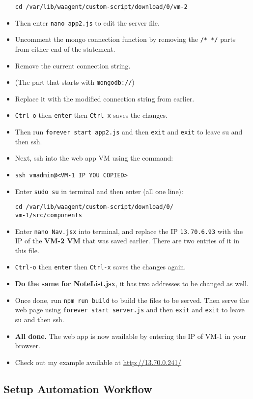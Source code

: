 \documentclass[12pt]{extarticle}
\begin{document}
\begin{itemize}
  \texttt{cd\ /var/lib/waagent/custom-script/download/0/vm-2}
\item
  Then enter \texttt{nano\ app2.js} to edit the server file.
\item
  Uncomment the mongo connection function by removing the
  \texttt{/*\ */} parts from either end of the statement.
\item
  Remove the current connection string.
  \item (The part that starts with \texttt{mongodb://})
\item
  Replace it with the modified connection string from earlier.
\item
  \texttt{Ctrl-o} then \texttt{enter} then \texttt{Ctrl-x} saves the
  changes.
\item
  Then run \texttt{forever\ start\ app2.js} and then \texttt{exit} and
  \texttt{exit} to leave su and then ssh.
\item
  Next, ssh into the web app VM using the command:
\item \texttt{ssh\ vmadmin@<VM-1\ IP\ YOU\ COPIED>}
\item
  Enter \texttt{sudo\ su} in terminal and then enter (all one line):
  \begin{lstlisting}
cd /var/lib/waagent/custom-script/download/0/
vm-1/src/components
     	\end{lstlisting}
\item
  Enter \texttt{nano\ Nav.jsx} into terminal, and replace the IP
  \texttt{13.70.6.93} with the IP of the \textbf{VM-2 VM} that was saved
  earlier. There are two entries of it in this file.
\item
  \texttt{Ctrl-o} then \texttt{enter} then \texttt{Ctrl-x} saves the
  changes again.
\item
  \textbf{Do the same for NoteList.jsx}, it has two addresses to be
  changed as well.
\item
  Once done, run \texttt{npm\ run\ build} to build the files to be
  served. Then serve the web page using
  \texttt{forever\ start\ server.js} and then \texttt{exit} and
  \texttt{exit} to leave su and then ssh.
\item
  \textbf{All done.} The web app is now available by entering the IP of
  VM-1 in your browser.
\item
  Check out my example available at \url{http://13.70.0.241/}
\end{itemize}

\subsection{Setup Automation Workflow}
\end{document}

